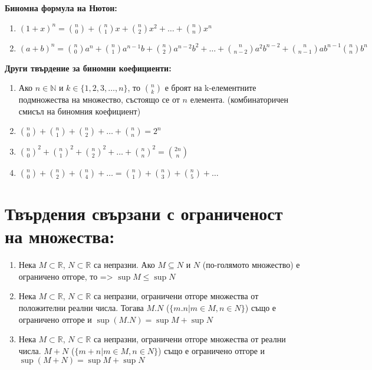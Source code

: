 \documentclass[11pt,oneside,a4paper]{article}
\begin{document}
\textbf{Биномна формула на Нютон: }\vspace{-\baselineskip}
\begin{enumerate}[label=\textbf{(\alph*)}]
    \item \((1 + x)^n = \binom{n}{0} + \binom{n}{1}x + \binom{n}{2}x^2 + \dots + \binom{n}{n}x^n\)
    \item \((a + b)^n = \binom{n}{0}a^n + \binom{n}{1}a^{n-1}b + \binom{n}{2}a^{n-2}b^2 + \dots + \binom{n}{n-2}a^2b^{n-2} + \binom{n}{n-1}ab^{n-1} \binom{n}{n}b^n \)
\end{enumerate}

\textbf{Други твърдение за биномни коефициенти: }\vspace{-\baselineskip}
\begin{enumerate}[label=\textbf{(\alph*)}]
    \item Ако \(n \in \mathbb{N}\) и \(k \in \{1, 2, 3, \dots, n\}\), то \(\binom{n}{k}\) е броят на k-елементните подмножества на множество, състоящо се от \(n\) елемента. (комбинаторичен смисъл на биномния коефициент)
    \item \(\binom{n}{0} + \binom{n}{1} + \binom{n}{2} + \dots + \binom{n}{n} = 2^n\)
    \item \(\binom{n}{0}^2 + \binom{n}{1}^2 + \binom{n}{2}^2 + \dots + \binom{n}{n}^2 = \binom{2n}{n}\)
    \item \(\binom{n}{0} + \binom{n}{2} + \binom{n}{4} + \dots = \binom{n}{1} + \binom{n}{3} + \binom{n}{5} + \dots \)
\end{enumerate}

\section*{Твърдения свързани с ограниченост на множества:}

\begin{enumerate}
    \item Нека \(M \subset \mathbb{R}\), \(N \subset \mathbb{R}\) са непразни. Ако \(M \subseteq N\) и \(N\) (по-голямото множество) е ограничено отгоре, то => \(\sup M \leq \sup N\)
    \item Нека \(M \subset \mathbb{R}\), \(N \subset \mathbb{R}\) са непразни, ограничени отгоре множества от положителни реални числа. Тогава \(M.N\) (\(\{m.n | m \in M, n \in N\}\)) също е ограничено отгоре и \(\sup (M.N) = \sup M + \sup N\)
    \item Нека \(M \subset \mathbb{R}\), \(N \subset \mathbb{R}\) са непразни, ограничени отгоре множества от реални числа. \(M + N\) (\(\{m + n | m \in M, n \in N\}\)) също е ограничено отгоре и \(\sup (M + N) = \sup M + \sup N\) 
\end{enumerate}
\end{document}
